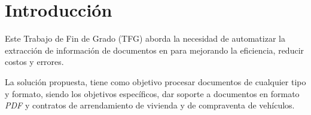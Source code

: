 \chapter{Introducción}\label{ch:chapter_1}

Este Trabajo de Fin de Grado (TFG) aborda la necesidad de automatizar la extracción de información de documentos en para
mejorando la eficiencia, reducir costos y errores.

La solución propuesta, tiene como objetivo procesar documentos de cualquier tipo y formato, siendo los objetivos
específicos, dar soporte a documentos en formato \textit{PDF} y contratos de arrendamiento de vivienda y de compraventa
de vehículos.





